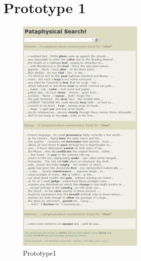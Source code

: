 \section{Prototype 1}

\begin{figure}[htb] %
  \centering
  \includegraphics[height=0.6\textheight]{images/prototype01}
\caption[Prototype1]{Prototype1}
\label{fig:Prototype1x}
\end{figure}
